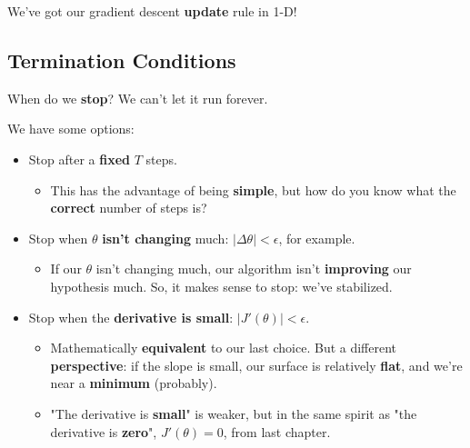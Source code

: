         We've got our gradient descent \textbf{update} rule in 1-D!
    
    \subsection{Termination Conditions}
    
        When do we \textbf{stop}? We can't let it run forever.
        
        We have some options:
        
        \begin{itemize}
            \item Stop after a \textbf{fixed} $T$ steps.
                \begin{itemize}
                    \item This has the advantage of being \textbf{simple}, but how do you know what the \textbf{correct} number of steps is?
                \end{itemize}
            
            \item Stop when $\theta$ \textbf{isn't changing} much: $\big| \Delta \theta \big| < \epsilon$, for example.
            \begin{itemize}
                \item If our $\theta$ isn't changing much, our algorithm isn't \textbf{improving} our hypothesis much. So, it makes sense to stop: we've stabilized.
            \end{itemize}
            
            \item Stop when the \textbf{derivative is small}: $\big| J'(\theta) \big| < \epsilon$.
            \begin{itemize}
                \item Mathematically \textbf{equivalent} to our last choice. But a different \textbf{perspective}: if the slope is small, our surface is relatively \textbf{flat}, and we're near a \textbf{minimum} (probably).
                
                \item "The derivative is \textbf{small}" is weaker, but in the same spirit as "the derivative is \textbf{zero}", $J'(\theta)=0$, from last chapter.
            \end{itemize}
            
        \end{itemize}
        
